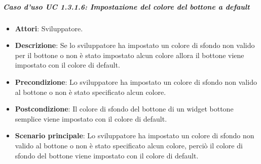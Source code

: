 \subparagraph{Caso d'uso UC 1.3.1.6: Impostazione del colore del bottone a default}

\FloatBarrier
\begin{itemize}
\item\textbf{Attori}: Sviluppatore.
\item\textbf{Descrizione}: Se lo sviluppatore ha impostato un colore di sfondo non valido per il bottone o non è stato impostato alcun colore allora il bottone viene impostato con il colore di default.
\item\textbf{Precondizione}: Lo sviluppatore ha impostato un colore di sfondo non valido al bottone o non è stato specificato alcun colore.
\item\textbf{Postcondizione}: Il colore di sfondo del bottone di un widget bottone semplice viene impostato con il colore di default.
\item\textbf{Scenario principale}: Lo sviluppatore ha impostato un colore di sfondo non valido al bottone o non è stato specificato alcun colore, perciò il colore di sfondo del bottone viene impostato con il colore di default.
\end{itemize}
